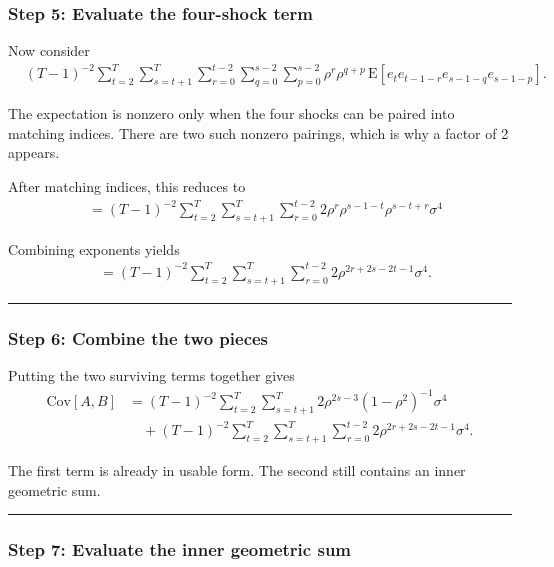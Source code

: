 \documentclass[11pt]{article}
\begin{document}
\subsubsection{Step 5: Evaluate the four-shock
term}\label{step-5-evaluate-the-four-shock-term}

Now consider \[
\begin{aligned}
&(T-1)^{-2}\sum_{t=2}^{T}\sum_{s=t+1}^{T}\sum_{r=0}^{t-2}\sum_{q=0}^{s-2}\sum_{p=0}^{s-2}
\rho^r\rho^{q+p}\,\text{E}[e_t e_{t-1-r}e_{s-1-q}e_{s-1-p}].
\end{aligned}
\]

The expectation is nonzero only when the four shocks can be paired into
matching indices. There are two such nonzero pairings, which is why a
factor of 2 appears.

After matching indices, this reduces to \[
\begin{aligned}
&=
(T-1)^{-2}\sum_{t=2}^{T}\sum_{s=t+1}^{T}\sum_{r=0}^{t-2}
2\rho^r\rho^{s-1-t}\rho^{s-t+r}\sigma^4
\end{aligned}
\]

Combining exponents yields \[
\begin{aligned}
&=
(T-1)^{-2}\sum_{t=2}^{T}\sum_{s=t+1}^{T}\sum_{r=0}^{t-2}
2\rho^{2r+2s-2t-1}\sigma^4.
\end{aligned}
\]

\begin{center}\rule{0.5\linewidth}{0.5pt}\end{center}

\subsubsection{Step 6: Combine the two
pieces}\label{step-6-combine-the-two-pieces}

Putting the two surviving terms together gives \[
\begin{aligned}
\text{Cov}[A,B]
&=
(T-1)^{-2}\sum_{t=2}^{T}\sum_{s=t+1}^{T}
2\rho^{2s-3}(1-\rho^2)^{-1}\sigma^4\\
&\quad+
(T-1)^{-2}\sum_{t=2}^{T}\sum_{s=t+1}^{T}\sum_{r=0}^{t-2}
2\rho^{2r+2s-2t-1}\sigma^4.
\end{aligned}
\]

The first term is already in usable form. The second still contains an
inner geometric sum.

\begin{center}\rule{0.5\linewidth}{0.5pt}\end{center}

\subsubsection{Step 7: Evaluate the inner geometric
sum}\label{step-7-evaluate-the-inner-geometric-sum}
\end{document}
